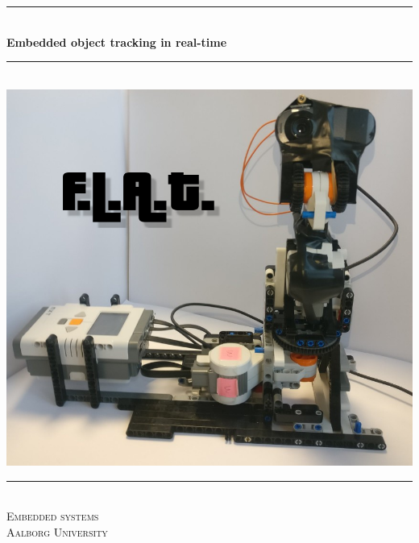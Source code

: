 \begin{titlingpage}

  \centering
  \rule{\linewidth}{0.2 mm} \\[0.5 cm]
  { \huge \bfseries Embedded object tracking in real-time}\\
  \rule{\linewidth}{0.2 mm} \\[2 cm]
  \includegraphics[scale=0.70]{images/flat_logo.png}\\[2 cm]
  \rule{\linewidth}{0.2 mm} \\[0.3 cm]
  \textsc{\LARGE Embedded systems} \\[0.5 cm]
  \textsc{\large Aalborg University}\\[0.5 cm]
  {\Large \groupnumber}\\[0.5 cm]

\end{titlingpage}
